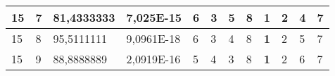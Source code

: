 \documentclass[conference]{IEEEtran}
\begin{document}
\begin{table*}[]
\begin{tabular}{|llll|llllllll|}
\multicolumn{1}{|l|}{15}                                                    & \multicolumn{1}{l|}{7}                                                        & \multicolumn{1}{l|}{81,4333333}                                                   & 7,025E-15                      & \multicolumn{1}{l|}{6}                                                  & \multicolumn{1}{l|}{3}                                                  & \multicolumn{1}{l|}{5}                                                  & \multicolumn{1}{l|}{8}                                                  & \multicolumn{1}{l|}{\textbf{1}}                                         & \multicolumn{1}{l|}{2}                                                  & \multicolumn{1}{l|}{4}                                                  & 7                          \\ \hline
\multicolumn{1}{|l|}{15}                                                    & \multicolumn{1}{l|}{8}                                                        & \multicolumn{1}{l|}{95,5111111}                                                   & 9,0961E-18                     & \multicolumn{1}{l|}{6}                                                  & \multicolumn{1}{l|}{3}                                                  & \multicolumn{1}{l|}{4}                                                  & \multicolumn{1}{l|}{8}                                                  & \multicolumn{1}{l|}{\textbf{1}}                                         & \multicolumn{1}{l|}{2}                                                  & \multicolumn{1}{l|}{5}                                                  & 7                          \\ \hline
\multicolumn{1}{|l|}{15}                                                    & \multicolumn{1}{l|}{9}                                                        & \multicolumn{1}{l|}{88,8888889}                                                   & 2,0919E-16                     & \multicolumn{1}{l|}{5}                                                  & \multicolumn{1}{l|}{4}                                                  & \multicolumn{1}{l|}{3}                                                  & \multicolumn{1}{l|}{8}                                                  & \multicolumn{1}{l|}{\textbf{1}}                                         & \multicolumn{1}{l|}{2}                                                  & \multicolumn{1}{l|}{6}                                                  & 7                          \\ \hline

\end{tabular}
\end{table*}
\end{document}
